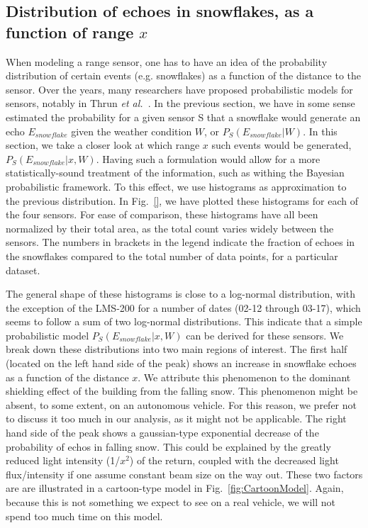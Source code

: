 \subsection{Distribution of echoes in snowflakes, as a function of range $x$}
\label{subsub:Histo}

When modeling a range sensor, one has to have an idea of the probability distribution of certain events (e.g. snowflakes) as a function of the distance to the sensor. Over the years, many researchers have proposed probabilistic models for sensors, notably in Thrun \emph{et al.}~\cite{Thrun:2005:PR:1121596}. In the previous section, we have in some sense estimated the probability for a given sensor S that a snowflake would generate an echo $E_{snowflake}$ given the weather condition $W$, or $P_S(E_{snowflake}|W)$. In this section, we take a closer look at which range $x$ such events would be generated, $P_S(E_{snowflake}|x,W)$. Having such a formulation would allow for a more statistically-sound treatment of the information, such as withing the Bayesian probabilistic framework. To this effect, we use histograms as approximation to the previous distribution. In Fig.~\ref{}, we have plotted these histograms for each of the four sensors. For ease of comparison, these histograms have all been normalized by their total area, as the total count varies widely between the sensors. The numbers in brackets in the legend indicate the fraction of echoes in the snowflakes compared to the total number of data points, for a particular dataset.


The general shape of these histograms is close to a log-normal distribution, with the exception of the LMS-200 for a number of dates (02-12 through 03-17), which seems to follow a sum of two log-normal distributions. This indicate that a simple probabilistic model $P_S(E_{snowflake}|x,W)$ can be derived for these sensors. We break down these distributions into two main regions of interest. The first half (located on the left hand side of the peak) shows an increase in snowflake echoes as a function of the distance $x$. We attribute this phenomenon to the dominant shielding effect of the building from the falling snow. This phenomenon might be absent, to some extent, on an autonomous vehicle. For this reason, we prefer not to discuss it too much in our analysis, as it might not be applicable. The right hand side of the peak shows a gaussian-type exponential decrease of the probability of echos in falling snow. This could be explained by the greatly reduced light intensity (1/$x^2$) of the return, coupled with the decreased light flux/intensity if one assume constant beam size on the way out. These two factors are are illustrated in a cartoon-type model in Fig.~\ref{fig:CartoonModel}. Again, because this is not something we expect to see on a real vehicle, we will not spend too much time on this model.

